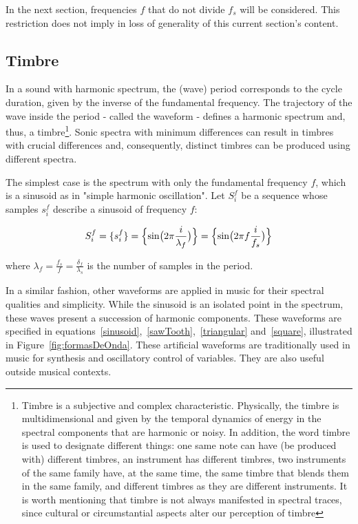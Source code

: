In the next section, frequencies $f$ that do not divide $f_s$ will be considered. This restriction does not imply in loss of generality of this current section's content.

\subsection{Timbre}

In a sound with harmonic spectrum, the (wave) period corresponds to the cycle duration, given by the inverse of the fundamental frequency. The trajectory of the wave inside the period - called the waveform - defines a harmonic spectrum and, thus, a timbre\footnote{Timbre is a subjective and complex characteristic. Physically, the timbre is multidimensional and given by the temporal dynamics of energy in the spectral components that are harmonic or noisy. In addition, the word timbre is used to designate different things: one same note can have (be produced with) different timbres, an instrument has different timbres, two instruments of the same family have, at the same time, the same timbre that blends them in the same family, and different timbres as they are different instruments. It is worth mentioning that timbre is not always manifested in spectral traces, since cultural or circumstantial aspects alter our perception of timbre}. Sonic spectra with minimum differences can result in timbres with crucial differences and, consequently, distinct timbres can be produced using different spectra\cite{Roederer}.

The simplest case is the spectrum with only the fundamental frequency $f$, which is a sinusoid as in "simple harmonic oscillation". Let $S_i^f$ be a sequence whose samples $s_i^f$ describe a sinusoid of frequency $f$:

\begin{equation}\label{sinusoid}
     S^f_i=\{ s^f_i \}=\Bigl\{ \sin\bigl(2\pi \frac{i}{\lambda_f} \bigr)  \Bigr\} = \Bigl\{ \sin\bigl(2\pi f \frac{i}{f_s}\bigr)  \Bigr\} 
\end{equation}

where $\lambda_f=\frac{f_s}{f}=\frac{\delta_f}{\lambda_s}$ is the number of samples in the period.

In a similar fashion, other waveforms are applied in music for their spectral qualities and simplicity. While the sinusoid is an isolated point in the spectrum, these waves present a succession of harmonic components. These waveforms are specified in equations~\ref{sinusoid},~\ref{sawTooth},~\ref{triangular} and~\ref{square}, illustrated in Figure~\ref{fig:formasDeOnda}.
These artificial waveforms are traditionally used in music for synthesis and oscillatory control of variables. They are also useful outside musical contexts\cite{Openheim}.

